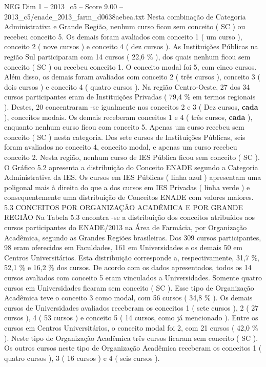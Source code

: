\begin{textsample}{NEG Dim 1 – 2013\_c5 – Score 9.00 – 2013\_c5/enade\_2013\_farm\_d0638aebea.txt}
Nesta combinação de Categoria Administrativa e Grande Região, nenhum curso ficou sem conceito ( SC ) ou recebeu conceito 5.
Os demais foram avaliados com conceito 1 ( um curso ), conceito 2 ( nove cursos ) e conceito 4 ( dez cursos ).
As Instituições Públicas na região Sul participaram com 14 cursos ( 22,6 \% ), dos quais nenhum ficou sem conceito ( SC ) ou recebeu conceito 1.
O conceito modal foi 5, com cinco cursos.
Além disso, os demais foram avaliados com conceito 2 ( três cursos ), conceito 3 ( dois cursos ) e conceito 4 ( quatro cursos ).
Na região Centro-Oeste, 27 dos 34 cursos participantes eram de Instituições Privadas ( 79,4 \% em termos regionais ).
Destes, 20 concentraram -se igualmente nos conceitos 2 e 3 ( Dez cursos, \textbf{cada} ), conceitos modais.
Os demais receberam conceitos 1 e 4 ( três cursos, \textbf{cada} ), enquanto nenhum curso ficou com conceito 5.
Apenas um curso recebeu sem conceito ( SC ) nesta categoria.
Dos sete cursos de Instituições Públicas, seis foram avaliados no conceito 4, conceito modal, e apenas um curso recebeu conceito 2.
Nesta região, nenhum curso de IES Pública ficou sem conceito ( SC ).
O Gráfico 5.2 apresenta a distribuição do Conceito ENADE segundo a Categoria Administrativa da IES.
Os cursos em IES Públicas ( linha azul ) apresentam uma poligonal mais à direita do que a dos cursos em IES Privadas ( linha verde ) e consequentemente uma distribuição de Conceitos ENADE com valores maiores. 5.3 CONCEITOS POR ORGANIZAÇÃO ACADÊMICA E POR GRANDE REGIÃO Na Tabela 5.3 encontra -se a distribuição dos conceitos atribuídos aos cursos participantes do ENADE/2013 na Área de Farmácia, por Organização Acadêmica, segundo as Grandes Regiões brasileiras.
Dos 309 cursos participantes, 98 eram oferecidos em Faculdades, 161 em Universidades e os demais 50 em Centros Universitários.
Esta distribuição corresponde a, respectivamente, 31,7 \%, 52,1 \% e 16,2 \% dos cursos.
De acordo com os dados apresentados, todos os 14 cursos avaliados com conceito 5 eram vinculados a Universidades.
Somente quatro cursos em Universidades ficaram sem conceito ( SC ).
Esse tipo de Organização Acadêmica teve o conceito 3 como modal, com 56 cursos ( 34,8 \% ).
Os demais cursos de Universidades avaliados receberam os conceitos 1 ( sete cursos ), 2 ( 27 cursos ), 4 ( 53 cursos ) e conceito 5 ( 14 cursos, como já mencionado ).
Entre os cursos em Centros Universitários, o conceito modal foi 2, com 21 cursos ( 42,0 \% ).
Neste tipo de Organização Acadêmica três cursos ficaram sem conceito ( SC ).
Os outros cursos neste tipo de Organização Acadêmica receberam os conceitos 1 ( quatro cursos ), 3 ( 16 cursos ) e 4 ( seis cursos ).

\end{textsample}
